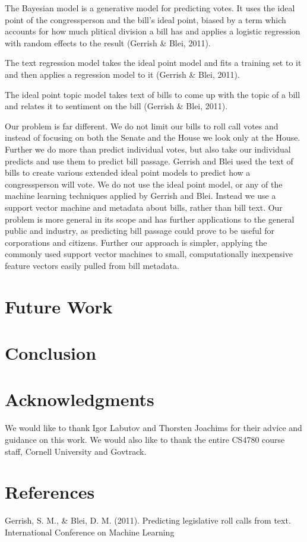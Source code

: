\documentclass[11pt,letterpaper,twocolumn]{article}
\begin{document}
The Bayesian model is a generative model for predicting votes. It uses the ideal point of the congressperson and the bill's ideal point, biased by a term which accounts for how much plitical division a bill has and applies a logistic regression with random effects to the result (Gerrish \& Blei, 2011). 

The text regression model takes the ideal point model and fits a training set to it and then applies a regression model to it (Gerrish \& Blei, 2011).

The ideal point topic model takes text of bills to come up with the topic of a bill and relates it to sentiment on the bill (Gerrish \& Blei, 2011).

Our problem is far different. We do not limit our bills to roll call votes and instead of focusing on both the Senate and the House we look only at the House. Further we do more than predict individual votes, but also take our individual predicts and use them to predict bill passage. Gerrish and Blei used the text of bills to create various extended ideal point models to predict how a congressperson will vote. We do not use the ideal point model, or any of the machine learning techniques applied by Gerrish and Blei. Instead we use a support vector machine and metadata about bills, rather than bill text. Our problem is more general in its scope and has further applications to the general public and industry, as predicting bill passage could prove to be useful for  corporations and citizens. Further our approach is simpler, applying the commonly used support vector machines to small, computationally inexpensive feature vectors easily pulled from bill metadata.

\section{Future Work}

\section{Conclusion}

\section*{Acknowledgments}

We would like to thank Igor Labutov and Thorsten Joachims for their advice and guidance on this work. We would also like to thank the entire CS4780 course staff, Cornell University and Govtrack. 

\pagebreak

\section*{References}

Gerrish, S. M., \& Blei, D. M. (2011). Predicting legislative roll calls from text. International Conference on Machine Learning
\end{document}
